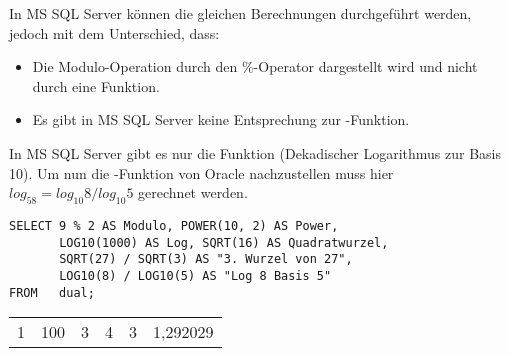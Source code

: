         In MS SQL Server können die gleichen Berechnungen durchgeführt
        werden, jedoch mit dem Unterschied, dass:
        \begin{itemize}
          \item Die Modulo-Operation durch den \%-Operator dargestellt wird und
          nicht durch eine Funktion.
          \item Es gibt in MS SQL Server keine Entsprechung zur
          -Funktion.
        \end{itemize}
        In MS SQL Server gibt es nur die Funktion 
        (Dekadischer Logarithmus zur Basis 10). Um nun die
        -Funktion von Oracle nachzustellen muss hier $log_58
        = log_{10}8 / log_{10}5$ gerechnet werden.
        \begin{lstlisting}[language=ms_sql,caption={Höhere Rechenarten in MS SQL Server},label=sql03_18]
SELECT 9 % 2 AS Modulo, POWER(10, 2) AS Power,
       LOG10(1000) AS Log, SQRT(16) AS Quadratwurzel,
       SQRT(27) / SQRT(3) AS "3. Wurzel von 27",
       LOG10(8) / LOG10(5) AS "Log 8 Basis 5"
FROM   dual;
        \end{lstlisting}
        \begin{center}
          \begin{small}
            \tablehead{}
            \begin{mssql}
              \begin{supertabular}{llllll}
                1 & 100 & 3 & 4 & 3 & 1,292029 \\
              \end{supertabular}
            \end{mssql}
          \end{small}
        \end{center}
